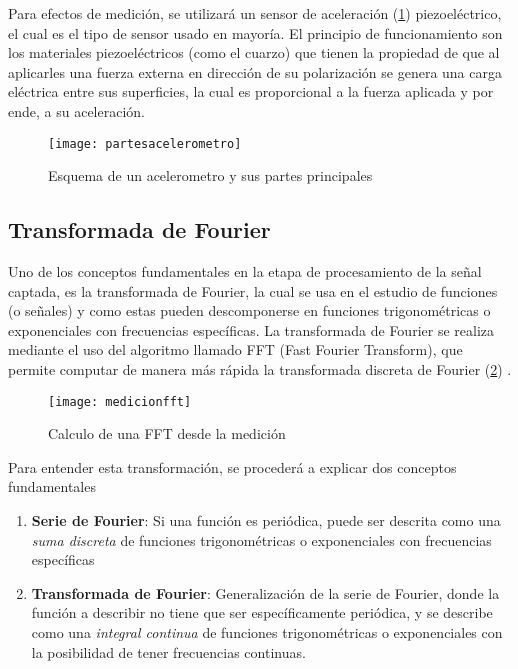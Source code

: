 			Para efectos de medición, se utilizará un sensor de aceleración (\ref{fig:acellpartes}) piezoeléctrico, el cual es el tipo de sensor usado en mayoría. El principio de funcionamiento son los materiales piezoeléctricos (como el cuarzo) que tienen la propiedad de que al aplicarles una fuerza externa en dirección de su polarización se genera una carga eléctrica entre sus superficies, la cual es proporcional a la fuerza aplicada y por ende, a su aceleración. \\			
			\begin{figure}[t]
				\centering
				\texttt{[image: partesacelerometro]}
				\caption{Esquema de un acelerometro y sus partes principales}
				\label{fig:acellpartes}
			\end{figure}
		
		\subsection{Transformada de Fourier}
			Uno de los conceptos fundamentales en la etapa de procesamiento de la señal captada, es la transformada de Fourier, la cual se usa en el estudio de funciones (o señales) y como estas pueden descomponerse en funciones trigonométricas o exponenciales con frecuencias específicas. La transformada de Fourier se realiza mediante el uso del algoritmo llamado FFT (Fast Fourier Transform), que permite computar de manera más rápida la transformada discreta de Fourier (\ref{fig:medicionfft}) \cite{fourieranalysis}.\\
			\begin{figure}[t]
				\centering
				\texttt{[image: medicionfft]}
				\caption{Calculo de una FFT desde la medición}
				\label{fig:medicionfft}
			\end{figure}
		
		Para entender esta transformación, se procederá a explicar dos conceptos fundamentales
		\begin{enumerate}
			\item \textbf{Serie de Fourier}: Si una función es periódica, puede ser descrita como una \textit{suma discreta} de funciones trigonométricas o exponenciales con frecuencias específicas
			
			\item \textbf{Transformada de Fourier}: Generalización de la serie de Fourier, donde la función a describir no tiene que ser específicamente periódica, y se describe como una \textit{integral continua} de funciones trigonométricas o exponenciales con la posibilidad de tener frecuencias continuas.
		\end{enumerate}
	
